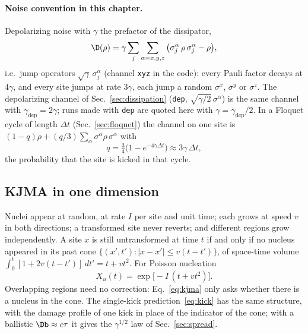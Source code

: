 \paragraph{Noise convention in this chapter.} Depolarizing noise with $\gamma$ the prefactor of the dissipator,
\begin{equation}
\D(\rho) = \gamma \sum_j \sum_{\alpha = x,y,z} \big(\sigma^\alpha_j\,\rho\,\sigma^\alpha_j - \rho\big),
\label{eq:kjma-dep}
\end{equation}
i.e.\ jump operators $\sqrt\gamma\,\sigma^\alpha_j$ (channel \texttt{xyz} in the code): every Pauli factor decays at $4\gamma$, and every site jumps at rate $3\gamma$, each jump a random $\sigma^x$, $\sigma^y$ or $\sigma^z$. The depolarizing channel of Sec.~\ref{sec:dissipation} (\texttt{dep}, $\sqrt{\gamma/2}\,\sigma^\alpha$) is the same channel with $\gamma_{\mathrm{dep}} = 2\gamma$; runs made with \texttt{dep} are quoted here with $\gamma = \gamma_{\mathrm{dep}}/2$. In a Floquet cycle of length $\Delta t$ (Sec.~\ref{sec:floquet}) the channel on one site is $(1 - q)\rho + (q/3)\sum_\alpha\sigma^\alpha\rho\,\sigma^\alpha$ with
\begin{equation}
q = \tfrac34\big(1 - e^{-4\gamma\Delta t}\big) \approx 3\gamma\,\Delta t ,
\label{eq:kjma-q}
\end{equation}
the probability that the site is kicked in that cycle.

\subsection{KJMA in one dimension}
\label{sec:kjma-theory}

Nuclei appear at random, at rate $I$ per site and unit time; each grows at speed $v$ in both directions; a transformed site never reverts; and different regions grow independently. A site $x$ is still untransformed at time $t$ if and only if no nucleus appeared in its past cone $\{(x', t') : \lvert x - x'\rvert \le v(t - t')\}$, of space-time volume $\int_0^t [1 + 2v(t - t')]\,dt' = t + vt^2$. For Poisson nucleation
\begin{equation}
X_u(t) = \exp\!\big[-I\,(t + v t^2)\big].
\label{eq:kjma}
\end{equation}
Overlapping regions need no correction: Eq.~\eqref{eq:kjma} only asks whether there is a nucleus in the cone. The single-kick prediction~\eqref{eq:kick} has the same structure, with the damage profile of one kick in place of the indicator of the cone; with a ballistic $\Db \approx c\tau$ it gives the $\gamma^{1/2}$ law of Sec.~\ref{sec:spread}.

